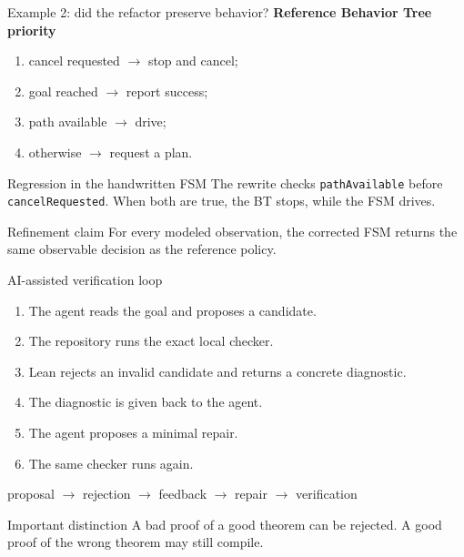 \documentclass[aspectratio=169,10pt]{beamer}
\begin{document}
\begin{frame}{Example 2: did the refactor preserve behavior?}
  \textbf{Reference Behavior Tree priority}
  \begin{enumerate}
    \item cancel requested $\rightarrow$ stop and cancel;
    \item goal reached $\rightarrow$ report success;
    \item path available $\rightarrow$ drive;
    \item otherwise $\rightarrow$ request a plan.
  \end{enumerate}

  \begin{alertblock}{Regression in the handwritten FSM}
    The rewrite checks \texttt{pathAvailable} before \texttt{cancelRequested}.
    When both are true, the BT stops, while the FSM drives.
  \end{alertblock}

  \begin{block}{Refinement claim}
    For every modeled observation, the corrected FSM returns the same observable
    decision as the reference policy.
  \end{block}
\end{frame}

\begin{frame}{AI-assisted verification loop}
  \begin{enumerate}
    \item The agent reads the goal and proposes a candidate.
    \item The repository runs the exact local checker.
    \item Lean rejects an invalid candidate and returns a concrete diagnostic.
    \item The diagnostic is given back to the agent.
    \item The agent proposes a minimal repair.
    \item The same checker runs again.
  \end{enumerate}

  \vspace{0.5em}
  \begin{center}
    \Large
    proposal $\rightarrow$ rejection $\rightarrow$ feedback
    $\rightarrow$ repair $\rightarrow$ verification
  \end{center}

  \begin{block}{Important distinction}
    A bad proof of a good theorem can be rejected. A good proof of the wrong
    theorem may still compile.
  \end{block}
\end{frame}
\end{document}
